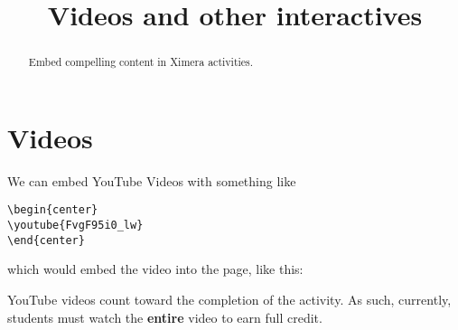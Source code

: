 \documentclass{ximera}
\title{Videos and other interactives}
\begin{document}
\begin{abstract}
  Embed compelling content in Ximera activities.
\end{abstract}
\maketitle

\section{Videos}

We can embed YouTube Videos with something like
\begin{verbatim}
\begin{center}
\youtube{FvgF95i0_lw}
\end{center}
\end{verbatim}
which would embed the video into the page, like this:
\begin{center}
\end{center}

\begin{warning}
  YouTube videos count toward the completion of the activity. As such,
  currently, students must watch the \textbf{entire} video to earn full credit.
\end{warning}
\end{document}
